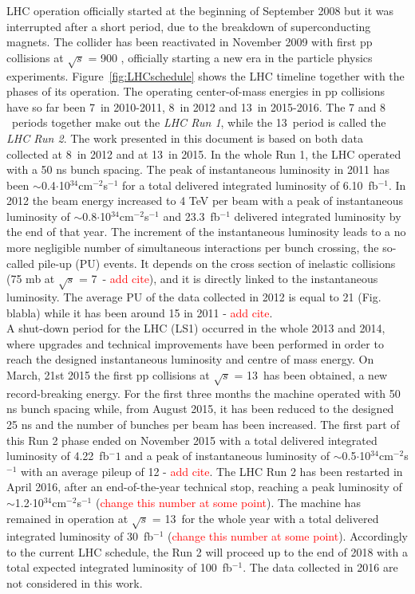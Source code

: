 LHC operation officially started at the beginning of September 2008 but it was interrupted after a short period, 
due to the breakdown of superconducting magnets. The collider has been reactivated in November 2009 with first pp collisions at
$\sqrt{s}$ = 900 \GeV, officially starting a new era in the particle physics experiments. Figure~\ref{fig:LHCschedule} shows the LHC timeline together with the phases of its operation. The operating center-of-mass energies in pp collisions have so far been 7~\TeV in 2010-2011, 8~\TeV in 2012 and 13~\TeV in 2015-2016.
The 7 and 8 ~\TeV periods together make out the {\itshape LHC Run 1}, while the 13~\TeV period is called the {\itshape LHC Run 2}.
The work presented in this document is based on both data collected at 8~\TeV in 2012 and at 13~\TeV in 2015.
In the whole Run 1, the LHC operated with a 50 ns bunch spacing.
The peak of instantaneous luminosity in 2011 has been $\sim$0.4$\cdot$10$^{34}$cm$^{−2}$s$^{−1}$ for a total delivered integrated luminosity of 6.10~fb$^{-1}$.
In 2012 the beam energy increased to 4 TeV per beam with a peak of instantaneous luminosity of $\sim$0.8$\cdot$10$^{34}$cm$^{−2}$s$^{−1}$ and 23.3~fb$^{-1}$ delivered integrated luminosity by the end of that year. The increment of the instantaneous luminosity leads to a no more negligible number of simultaneous interactions per bunch crossing, the so-called pile-up (PU) events. It depends on the cross section of inelastic collisions (75 mb at $\sqrt{s}$ = 7~\TeV - \textcolor{red}{add cite}), and it is directly linked to the instantaneous luminosity. The average PU of the data collected in 2012 is equal to 21 (Fig. blabla) while it has been around 15 in 2011 - \textcolor{red}{add cite}.\\

A shut-down period for the LHC (LS1) occurred in the whole 2013 and 2014, where upgrades and technical improvements have been performed in order to reach the designed instantaneous luminosity and centre of mass energy. On March, 21st 2015 the first pp collisions at $\sqrt{s}$ = 13~\TeV has been obtained, a new record-breaking energy. For the first three months the machine operated with 50 ns bunch spacing while, from August 2015, it has been reduced to the designed 25 ns and the number of bunches per beam has been increased. The first part of this Run 2 phase ended on November 2015 with a total delivered integrated luminosity of 4.22~fb$^-1$ and a peak of instantaneous luminosity of $\sim$0.5$\cdot$10$^{34}$cm$^{−2}$s$^{−1}$ with an average pileup of 12 - \textcolor{red}{add cite}.
The LHC Run 2 has been restarted in April 2016, after an end-of-the-year technical stop, reaching a peak luminosity of $\sim$1.2$\cdot$10$^{34}$cm$^{−2}$s$^{−1}$ (\textcolor{red}{change this number at some point}). The machine has remained in operation at $\sqrt{s}$ = 13~\TeV for the whole year with a total delivered integrated luminosity of 30~fb$^{-1}$ (\textcolor{red}{change this number at some point}). Accordingly to the current LHC schedule, the Run 2 will proceed up to the end of 2018 with a total expected integrated luminosity of 100~fb$^{-1}$. The data collected in 2016 are not considered in this work.

